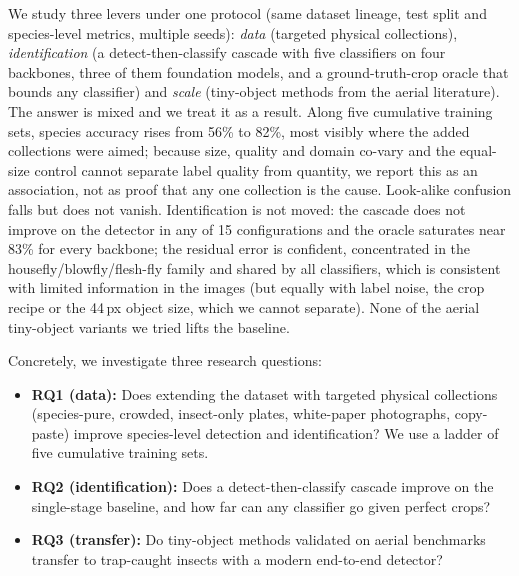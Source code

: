 We study three levers under one protocol (same dataset lineage, test split and species-level metrics, multiple seeds): \emph{data} (targeted physical collections), \emph{identification} (a detect-then-classify cascade with five classifiers on four backbones, three of them foundation models, and a ground-truth-crop oracle that bounds any classifier) and \emph{scale} (tiny-object methods from the aerial literature). The answer is mixed and we treat it as a result. Along five cumulative training sets, species accuracy rises from 56\% to 82\%, most visibly where the added collections were aimed; because size, quality and domain co-vary and the equal-size control cannot separate label quality from quantity, we report this as an association, not as proof that any one collection is the cause. Look-alike confusion falls but does not vanish. Identification is not moved: the cascade does not improve on the detector in any of 15 configurations and the oracle saturates near 83\% for every backbone; the residual error is confident, concentrated in the housefly/blowfly/flesh-fly family and shared by all classifiers, which is consistent with limited information in the images (but equally with label noise, the crop recipe or the 44\,px object size, which we cannot separate). None of the aerial tiny-object variants we tried lifts the baseline.

Concretely, we investigate three research questions:

\begin{itemize}
    \item \textbf{RQ1 (data):} Does extending the dataset with targeted physical collections (species-pure, crowded, insect-only plates, white-paper photographs, copy-paste) improve species-level detection and identification? We use a ladder of five cumulative training sets.
    \item \textbf{RQ2 (identification):} Does a detect-then-classify cascade improve on the single-stage baseline, and how far can any classifier go given perfect crops?
    \item \textbf{RQ3 (transfer):} Do tiny-object methods validated on aerial benchmarks transfer to trap-caught insects with a modern end-to-end detector?
\end{itemize}

